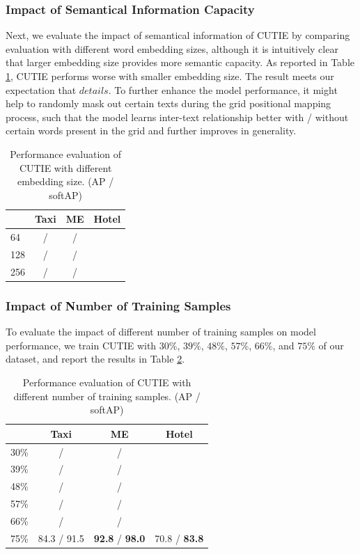 \documentclass[10pt,twocolumn,letterpaper]{article}
\begin{document}
\subsubsection{Impact of Semantical Information Capacity}
Next, we evaluate the impact of semantical information of CUTIE by comparing evaluation with different word embedding sizes, although it is intuitively clear that larger embedding size provides more semantic capacity. As reported in Table \ref{tab:embedding}, CUTIE performs worse with smaller embedding size. The result meets our expectation that $details$. To further enhance the model performance, it might help to randomly mask out certain texts during the grid positional mapping process, such that the model learns inter-text relationship better with / without certain words present in the grid and further improves in generality.
\begin{table}
	\caption{Performance evaluation of CUTIE with different embedding size. (AP / softAP)}
\begin{center}
\begin{tabular}{l | c | c | c}
	 & Taxi & ME & Hotel \\
	\hline
	64 & / & / & \\
	128 & / & / & \\
	256 & / & / & \\
\end{tabular}
\end{center}
	\label{tab:embedding}
\end{table}

\subsubsection{Impact of Number of Training Samples}
To evaluate the impact of different number of training samples on model performance, we train CUTIE with $30\%$, $39\%$, $48\%$, $57\%$, $66\%$, and $75\%$ of our dataset, and report the results in Table \ref{tab:samples}.
\begin{table}
	\caption{Performance evaluation of CUTIE with different number of training samples. (AP / softAP)}
\begin{center}
\begin{tabular}{l | c | c | c}
	 & Taxi & ME & Hotel \\
	\hline
	30\% & / & / & \\
	39\% & / & / & \\
	48\% & / & / & \\
	57\% & / & / & \\
	66\% & / & / & \\
	75\% & 84.3 / 91.5 & \textbf{92.8} / \textbf{98.0} & 70.8 / \textbf{83.8} \\
\end{tabular}
\end{center}
	\label{tab:samples}
\end{table}
\end{document}
